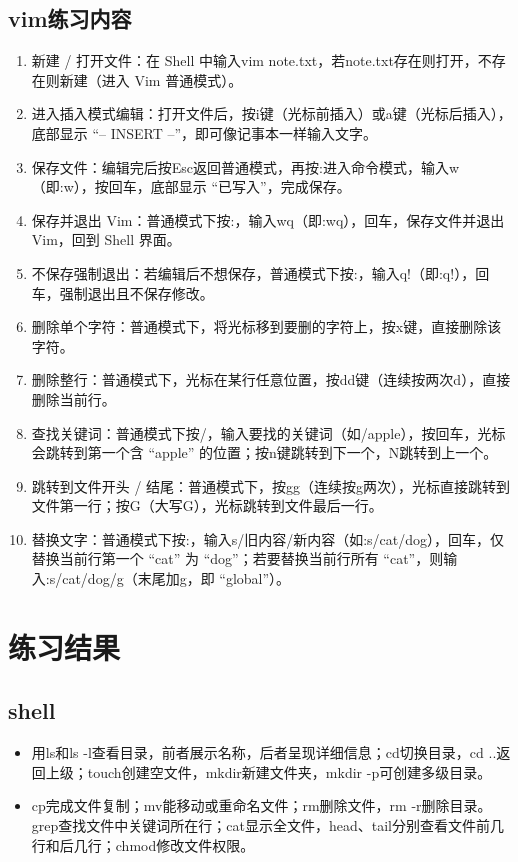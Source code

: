 \documentclass[10.5pt]{ctexart}
\begin{document}
\subsection{vim练习内容}
\begin{enumerate} 
    \item 新建 / 打开文件：在 Shell 中输入vim note.txt，若note.txt存在则打开，不存在则新建（进入 Vim 普通模式）。
    \item 进入插入模式编辑：打开文件后，按i键（光标前插入）或a键（光标后插入），底部显示 “-- INSERT --”，即可像记事本一样输入文字。
    \item 保存文件：编辑完后按Esc返回普通模式，再按:进入命令模式，输入w（即:w），按回车，底部显示 “已写入”，完成保存。
    \item 保存并退出 Vim：普通模式下按:，输入wq（即:wq），回车，保存文件并退出 Vim，回到 Shell 界面。
    \item 不保存强制退出：若编辑后不想保存，普通模式下按:，输入q!（即:q!），回车，强制退出且不保存修改。
    \item 删除单个字符：普通模式下，将光标移到要删的字符上，按x键，直接删除该字符。
    \item 删除整行：普通模式下，光标在某行任意位置，按dd键（连续按两次d），直接删除当前行。
    \item 查找关键词：普通模式下按/，输入要找的关键词（如/apple），按回车，光标会跳转到第一个含 “apple” 的位置；按n键跳转到下一个，N跳转到上一个。
    \item 跳转到文件开头 / 结尾：普通模式下，按gg（连续按g两次），光标直接跳转到文件第一行；按G（大写G），光标跳转到文件最后一行。
    \item 替换文字：普通模式下按:，输入s/旧内容/新内容（如:s/cat/dog），回车，仅替换当前行第一个 “cat” 为 “dog”；若要替换当前行所有 “cat”，则输入:s/cat/dog/g（末尾加g，即 “global”）。
\end{enumerate}
\section{练习结果}
\subsection{shell}
\begin{itemize}
\item 用ls和ls -l查看目录，前者展示名称，后者呈现详细信息；cd切换目录，cd ..返回上级；touch创建空文件，mkdir新建文件夹，mkdir -p可创建多级目录。
\item cp完成文件复制；mv能移动或重命名文件；rm删除文件，rm -r删除目录。grep查找文件中关键词所在行；cat显示全文件，head、tail分别查看文件前几行和后几行；chmod修改文件权限。
\end{itemize}
\end{document}
